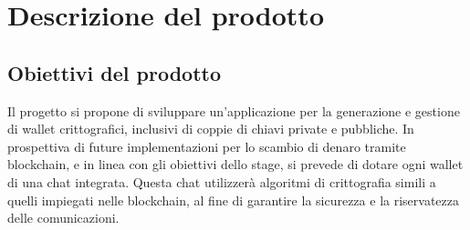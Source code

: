 \section{Descrizione del prodotto}
\subsection{Obiettivi del prodotto}
Il progetto si propone di sviluppare un'applicazione per la generazione e gestione
di wallet crittografici, inclusivi di coppie di chiavi private e pubbliche. 
In prospettiva di future implementazioni per lo scambio di denaro tramite blockchain,
e in linea con gli obiettivi dello stage, si prevede di dotare ogni wallet di una 
chat integrata. Questa chat utilizzerà algoritmi di crittografia simili a quelli
impiegati nelle blockchain, al fine di garantire la sicurezza e la riservatezza
delle comunicazioni.

